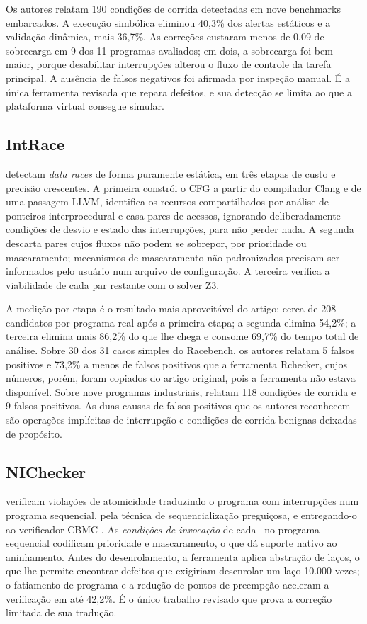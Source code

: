 Os autores relatam 190 condições de corrida detectadas em nove benchmarks
embarcados. A execução simbólica eliminou 40,3\% dos alertas estáticos e a
validação dinâmica, mais 36,7\%. As correções custaram menos de 0,09 de
sobrecarga em 9 dos 11 programas avaliados; em dois, a sobrecarga foi bem
maior, porque desabilitar interrupções alterou o fluxo de controle da tarefa
principal. A ausência de falsos negativos foi afirmada por inspeção manual. É
a única ferramenta revisada que repara defeitos, e sua detecção se limita ao
que a plataforma virtual consegue simular.

\subsection{IntRace}

 detectam \textit{data races} de forma puramente estática,
em três etapas de custo e precisão crescentes. A primeira constrói o CFG a
partir do compilador Clang e de uma passagem LLVM, identifica os recursos
compartilhados por análise de ponteiros interprocedural e casa pares de
acessos, ignorando deliberadamente condições de desvio e estado das
interrupções, para não perder nada. A segunda descarta pares cujos fluxos não
podem se sobrepor, por prioridade ou mascaramento; mecanismos de mascaramento
não padronizados precisam ser informados pelo usuário num arquivo de
configuração. A terceira verifica a viabilidade de cada par restante com o
solver Z3.

A medição por etapa é o resultado mais aproveitável do artigo: cerca de 208
candidatos por programa real após a primeira etapa; a segunda elimina 54,2\%;
a terceira elimina mais 86,2\% do que lhe chega e consome 69,7\% do tempo total
de análise. Sobre 30 dos 31 casos simples do Racebench, os autores relatam 5 falsos positivos e 73,2\% a
menos de falsos positivos que a ferramenta Rchecker, cujos números, porém,
foram copiados do artigo original, pois a ferramenta não estava disponível.
Sobre nove programas industriais, relatam 118 condições de corrida e 9 falsos
positivos. As duas causas de falsos positivos que os autores reconhecem são
operações implícitas de interrupção e condições de corrida benignas deixadas de
propósito.

\subsection{NIChecker}

 verificam violações de atomicidade traduzindo o programa
com interrupções num programa sequencial, pela técnica de sequencialização
preguiçosa, e entregando-o ao verificador CBMC \cite{lazycseq,cbmc}. As
\textit{condições de invocação} de cada \isr\ no programa sequencial codificam
prioridade e mascaramento, o que dá suporte nativo ao aninhamento. Antes do
desenrolamento, a ferramenta aplica abstração de laços, o que lhe permite
encontrar defeitos que exigiriam desenrolar um laço 10.000 vezes; o fatiamento
de programa e a redução de pontos de preempção aceleram a verificação em até
42,2\%. É o único trabalho revisado que prova a correção limitada de sua
tradução.

